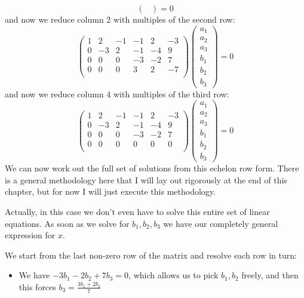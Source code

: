 \documentclass{article}
\newcommand{\chapternumber}{2}
\newenvironment{QandA}{\begin{enumerate}[label=\chapternumber.\arabic*]\bfseries\boldmath}
	{\end{enumerate}}
\newenvironment{answered}{\par\bigskip\normalfont\unboldmath}{}
\begin{document}
\begin{QandA}
\begin{answered}
\[\begin{pmatrix}
			\end{pmatrix}
			= 0
			\]
			and now we reduce column 2 with multiples of the second row:
			\[
			\begin{pmatrix}
				1 &  2 & -1 & -1 &  2 & -3  \\
				0 & -3 &  2  & -1 & -4 &  9\\
				0 &  0 & 0 & -3 &  -2 & 7 \\
				0 &  0 & 0 & 3 &  2 & -7\\
			\end{pmatrix}
			\begin{pmatrix}
				a_1 \\ a_2 \\ a_3 \\ b_1 \\ b_2 \\ b_3
			\end{pmatrix}
			= 0
			\]
			and now we reduce column 4 with multiples of the third row:
			\[
			\begin{pmatrix}
				1 &  2 & -1 & -1 &  2 & -3  \\
				0 & -3 &  2  & -1 & -4 &  9\\
				0 &  0 & 0 & -3 &  -2 & 7 \\
				0 &  0 & 0 & 0 &  0 & 0\\
			\end{pmatrix}
			\begin{pmatrix}
				a_1 \\ a_2 \\ a_3 \\ b_1 \\ b_2 \\ b_3
			\end{pmatrix}
			= 0
			\]
			We can now work out the full set of solutions from this echelon row form.
			There is a general methodology here that I will lay out rigorously at the end of this chapter, but for now I will just execute this methodology.
			
			Actually, in this case we don't even have to solve this entire set of linear equations. As soon as we solve for $b_1,b_2,b_3$ we have our completely general expression for $x$.
			
			We start from the last non-zero row of the matrix and resolve each row in turn:
			\begin{itemize}
				\item We have $-3b_1-2b_2+7b_3=0$, which allows us to pick $b_1,b_2$ freely, and then this forces $b_3=\frac{3b_1+2b_2}{7}$
			\end{itemize}
			

\end{answered}
\end{QandA}
\end{document}
